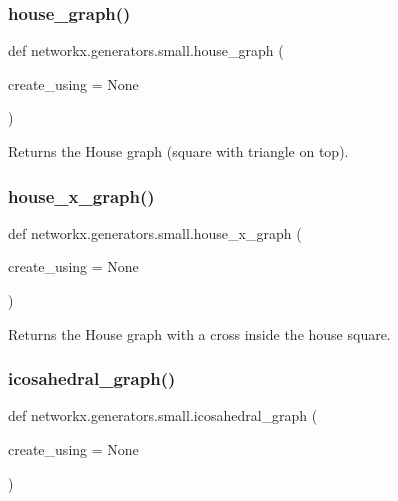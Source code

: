 \subsubsection{\texorpdfstring{house\+\_\+graph()}{house\_graph()}}
{\footnotesize\ttfamily def networkx.\+generators.\+small.\+house\+\_\+graph (\begin{DoxyParamCaption}\item[{}]{create\+\_\+using = {\ttfamily None} }\end{DoxyParamCaption})}

\begin{DoxyVerb}Returns the House graph (square with triangle on top).\end{DoxyVerb}
 \mbox{\label{namespacenetworkx_1_1generators_1_1small_a269cef6fe83cd6bc1a2821615b80e3aa}} 
\subsubsection{\texorpdfstring{house\+\_\+x\+\_\+graph()}{house\_x\_graph()}}
{\footnotesize\ttfamily def networkx.\+generators.\+small.\+house\+\_\+x\+\_\+graph (\begin{DoxyParamCaption}\item[{}]{create\+\_\+using = {\ttfamily None} }\end{DoxyParamCaption})}

\begin{DoxyVerb}Returns the House graph with a cross inside the house square.\end{DoxyVerb}
 \mbox{\label{namespacenetworkx_1_1generators_1_1small_ab63cbee2707f4887cd2aefe74483b0d3}} 
\subsubsection{\texorpdfstring{icosahedral\+\_\+graph()}{icosahedral\_graph()}}
{\footnotesize\ttfamily def networkx.\+generators.\+small.\+icosahedral\+\_\+graph (\begin{DoxyParamCaption}\item[{}]{create\+\_\+using = {\ttfamily None} }\end{DoxyParamCaption})}


